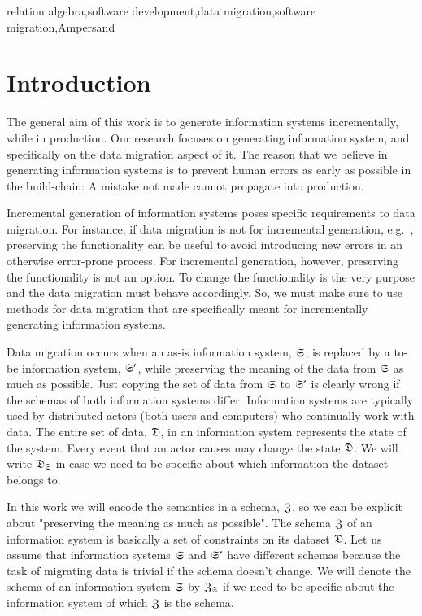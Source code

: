 \documentclass{elsarticle}
\begin{document}
\begin{keyword}
relation algebra\sep software development\sep data migration\sep software migration\sep Ampersand
\end{keyword}
\maketitle

\section{Introduction}
\label{sct:Introduction}
   The general aim of this work is to generate information systems incrementally, while in production.
   Our research focuses on generating information system,
   and specifically on the data migration aspect of it.
   The reason that we believe in generating information systems is to prevent human errors as early as possible in the build-chain:
   A mistake not made cannot propagate into production.

   Incremental generation of information systems poses specific requirements to data migration.
   For instance, if data migration is not for incremental generation,
   e.g.~\cite{Gholami2016,Bisbal1999},
   preserving the functionality can be useful to avoid introducing new errors in an otherwise error-prone process.
   For incremental generation, however, preserving the functionality is not an option.
   To change the functionality is the very purpose and the data migration must behave accordingly.
   So, we must make sure to use methods for data migration that are specifically meant for incrementally generating information systems.
   
   Data migration occurs when an as-is information system, $\mathfrak{S}$, is replaced by a to-be information system, $\mathfrak{S}'$,
   while preserving the meaning of the data from $\mathfrak{S}$ as much as possible.
   Just copying the set of data from $\mathfrak{S}$ to $\mathfrak{S}'$ is clearly wrong if the schemas of both information systems differ.
   Information systems are typically used by distributed actors (both users and computers) who continually work with data.
   The entire set of data, $\mathfrak{D}$, in an information system represents the state of the system.
   Every event that an actor causes may change the state $\mathfrak{D}$.
   We will write $\mathfrak{D}_{\mathfrak{S}}$ in case we need to be specific about which information the dataset belongs to.

   In this work we will encode the semantics in a schema, $\mathfrak{Z}$,
   so we can be explicit about "preserving the meaning as much as possible".
   The schema $\mathfrak{Z}$ of an information system is basically a set of constraints on its dataset $\mathfrak{D}$.
   Let us assume that information systems $\mathfrak{S}$ and $\mathfrak{S}'$ have different schemas
   because the task of migrating data is trivial if the schema doesn’t change.
   We will denote the schema of an information system $\mathfrak{S}$ by $\mathfrak{Z}_{\mathfrak{S}}$
   if we need to be specific about the information system of which $\mathfrak{Z}$ is the schema.
\end{document}
